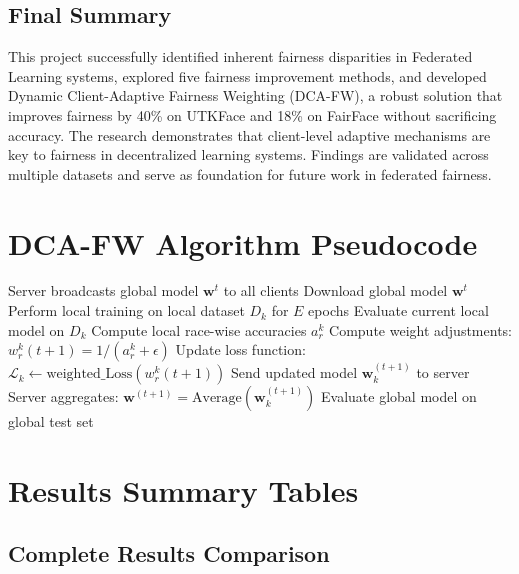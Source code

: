 \documentclass[11pt,a4paper]{report}
\begin{document}
\section{Final Summary}

This project successfully identified inherent fairness disparities in Federated Learning systems, explored five fairness improvement methods, and developed Dynamic Client-Adaptive Fairness Weighting (DCA-FW), a robust solution that improves fairness by 40\% on UTKFace and 18\% on FairFace without sacrificing accuracy. The research demonstrates that client-level adaptive mechanisms are key to fairness in decentralized learning systems. Findings are validated across multiple datasets and serve as foundation for future work in federated fairness.

\appendix

\chapter{DCA-FW Algorithm Pseudocode}

\begin{algorithm}
\caption{Dynamic Client-Adaptive Fairness Weighting}
\begin{algorithmic}[1]
    \State Server broadcasts global model $\mathbf{w}^t$ to all clients
        \State Download global model $\mathbf{w}^t$
        \State Perform local training on local dataset $D_k$ for $E$ epochs
            \State Evaluate current local model on $D_k$
            \State Compute local race-wise accuracies $a_r^k$
            \State Compute weight adjustments: $w_r^k(t+1) = 1/(a_r^k + \epsilon)$
            \State Update loss function: $\mathcal{L}_k \leftarrow \text{weighted\_Loss}(w_r^k(t+1))$
        \EndIf
        \State Send updated model $\mathbf{w}_k^{(t+1)}$ to server
    \EndFor
    \State Server aggregates: $\mathbf{w}^{(t+1)} = \text{Average}(\mathbf{w}_k^{(t+1)})$
    \State Evaluate global model on global test set
\EndFor
\end{algorithmic}
\end{algorithm}

\chapter{Results Summary Tables}

\section{Complete Results Comparison}
\end{document}
